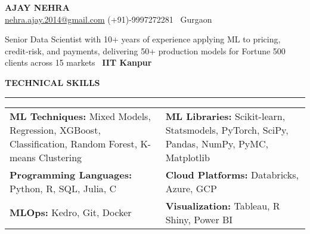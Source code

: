 \documentclass[a4paper,10pt]{article}
\begin{document}
\begin{center}
    \textbf{\LARGE \MakeUppercase{Ajay Nehra}} \\
    \vspace{1mm}
    \href{mailto:nehra.ajay.2014@gmail.com}{nehra.ajay.2014@gmail.com} \hspace{5mm}
    \href{https://www.linkedin.com/in/ajay-n-575bba23/}{\faLinkedin} \hspace{5mm}
    (+91)-9997272281 \hspace{5mm}
    \faMapMarker \, Gurgaon
\end{center}

\vspace{1mm}

{\large
Senior Data Scientist with 10+ years of experience applying ML to pricing, credit‑risk, and payments, delivering 50+ production models for Fortune 500 clients across 15 markets \textbar\ \textbf{IIT Kanpur}
}

\vspace{1mm}

\begin{center}
    \textbf{\LARGE \MakeUppercase{Technical Skills}}\\[-1.2ex]
    \noindent\rule{\textwidth}{0.8pt}
\end{center}


\noindent
\begin{tabular}{p{} p{}}
    \textbf{ML Techniques:} Mixed Models, Regression, XGBoost, Classification, Random Forest, K-means Clustering & \textbf{ML Libraries:} Scikit-learn, Statsmodels, PyTorch, SciPy, Pandas, NumPy, PyMC, Matplotlib \\
    \textbf{Programming Languages:} Python, R, SQL, Julia, C & \textbf{Cloud Platforms:} Databricks, Azure, GCP \\
    \textbf{MLOps:} Kedro, Git, Docker & \textbf{Visualization:} Tableau, R Shiny, Power BI \\
\end{tabular}
\end{document}

